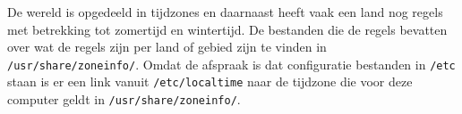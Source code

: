 De wereld is opgedeeld in tijdzones en daarnaast heeft vaak een land nog regels met betrekking tot zomertijd en wintertijd. De bestanden die de regels bevatten over wat de regels zijn per land of gebied zijn te vinden in \texttt{/usr/share/zoneinfo/}. Omdat de afspraak is dat configuratie bestanden in \texttt{/etc} staan is er een link vanuit \texttt{/etc/localtime} naar de tijdzone die voor deze computer geldt in \texttt{/usr/share/zoneinfo/}.

